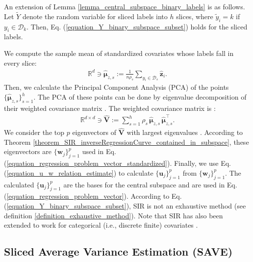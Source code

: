 \documentclass[lang=cn,10pt]{gorgeousnbook}
\numberwithin{equation}{section}%
\numberwithin{figure}{section}%
\begin{document}
\begin{corollary}\label{corollary_sliced_Y_subspace_relation}
An extension of Lemma \ref{lemma_central_subspace_binary_labels} is as follows. Let $\widetilde{Y}$ denote the random variable for sliced labels into $h$ slices, where $\widetilde{y}_i = k$ if $y_i \in \mathcal{D}_k$. Then, Eq. (\ref{equation_Y_binary_subspace_subset}) holds for the sliced labels. 
\end{corollary}

We compute the sample mean of standardized covariates whose labels fall in every slice:
\begin{align}\label{equation_mean_of_slice}
\mathbb{R}^{d} \ni \widehat{\boldsymbol{\mu}}_{z,s} := \frac{1}{n \rho_s} \sum_{y_i \in \mathcal{D}_s} \widehat{\boldsymbol{z}}_i.
\end{align}
Then, we calculate the Principal Component Analysis (PCA) of the points $\{\widehat{\boldsymbol{\mu}}_{z,s}\}_{s=1}^h$. The PCA of these points can be done by eigenvalue decomposition of their weighted covariance matrix \cite{ghojogh2019unsupervised}. The weighted covariance matrix is \cite{li1991sliced}:
\begin{align*}
\mathbb{R}^{d \times d} \ni \widehat{\boldsymbol{V}} := \sum_{s=1}^h \rho_s\, \widehat{\boldsymbol{\mu}}_{z,s}\, \widehat{\boldsymbol{\mu}}_{z,s}^\top.
\end{align*}
We consider the top $p$ eigenvectors of $\widehat{\boldsymbol{V}}$ with largest eigenvalues \cite{ghojogh2019eigenvalue}.
According to Theorem \ref{theorem_SIR_inverseRegressionCurve_contained_in_subspace}, these eigenvectors are $\{\boldsymbol{w}_j\}_{j=1}^p$ used in Eq. (\ref{equation_regression_problem_vector_standardized}). 
Finally, we use Eq. (\ref{equation_u_w_relation_estimate}) to calculate $\{\boldsymbol{u}_j\}_{j=1}^p$ from $\{\boldsymbol{w}_j\}_{j=1}^p$. The calculated $\{\boldsymbol{u}_j\}_{j=1}^p$ are the bases for the central subspace and are used in Eq. (\ref{equation_regression_problem_vector}).
According to Eq. (\ref{equation_Y_binary_subspace_subset}), SIR is not an exhaustive method (see definition \ref{definition_exhaustive_method}). 
Note that SIR has also been extended to work for categorical (i.e., discrete finite) covariates \cite{chiaromonte2002sufficient2}.

\subsection{Sliced Average Variance Estimation (SAVE)}\label{section_SAVE}
\end{document}

